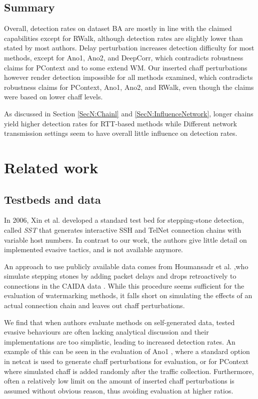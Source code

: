 \subsection{Summary}

Overall, detection rates on dataset BA are mostly in line with the claimed capabilities except for RWalk, although detection rates are slightly lower than stated by most authors. Delay perturbation increases detection difficulty for most methods, except for Ano1, Ano2, and DeepCorr, which contradicts robustness claims for PContext and to some extend WM. Our inserted chaff perturbations however render detection impossible for all methods examined, which contradicts robustness claims for PContext, Ano1, Ano2, and RWalk, even though the claims were based on lower chaff levels. 

As discussed in Section \ref{SecN:Chainl} and \ref{SecN:InfluenceNetwork}, longer chains yield higher detection rates for RTT-based methods while Different network transmission settings seem to have overall little influence on detection rates. 


\section{Related work}\label{SecN:Relatedwork}

\subsection{Testbeds and data}

In 2006, Xin et al. \cite{xin2006testbed} developed a standard test bed for stepping-stone detection, called \textit{SST} that generates interactive SSH and TelNet connection chains with variable host numbers.
In contrast to our work, the authors give little detail on implemented evasive tactics, and is not available anymore.

An approach to use publicly available data comes from Houmansadr et al. \cite{nasr2018deepcorr},who simulate stepping stones by adding packet delays and drops retroactively to connections in the CAIDA data \cite{CAIDA2018}.
While this procedure seems sufficient for the evaluation of watermarking methods, it falls short on simulating the effects of an actual connection chain and leaves out chaff perturbations. 

We find that when authors evaluate methods on self-generated data, tested evasive behaviours are often lacking analytical discussion and their implementations are too simplistic, leading to increased detection rates. An example of this can be seen in the evaluation of Ano1 \cite{di2011detecting}, where a standard option in netcat is used to generate chaff perturbations for evaluation, or for PContext \cite{yang2015rtt} where simulated chaff is added randomly after the traffic collection.%
Furthermore, often a relatively low limit on the amount of inserted chaff perturbations is assumed without obvious reason, thus avoiding evaluation at higher ratios. %





